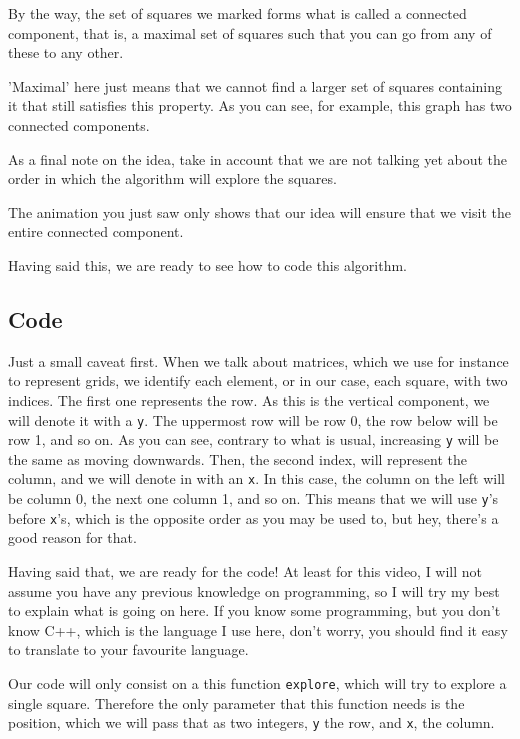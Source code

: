 \documentclass[12pt]{article}
\renewcommand{\v}[1]{\texttt{#1}}
\begin{document}
By the way, the set of squares we marked forms what is called
a connected component, that is, a maximal
set of squares such that you can go from any of these to any other.

'Maximal' here just means that we cannot find a larger set
of squares containing it that still satisfies this property.
As you can see, for example, this graph has two connected components.

As a final note on the idea, take in account that we
are not talking yet about the order in which the algorithm
will explore the squares.

The animation you just saw only shows
that our idea will ensure that we visit the entire
connected component.

Having said this, we are ready to see how
to code this algorithm.

\subsection{Code}

Just a small caveat first.
When we talk about matrices, which we use for instance to represent grids,
we identify each element, or in our case, each square,
with two indices. The first one represents the row.
As this is the vertical component, we will denote it
with a \v{y}. The uppermost row will be row 0, the row below
will be row 1, and so on. As you can see, contrary to what is
usual, increasing \v{y} will be the same as moving downwards.
Then, the second index, will represent the column, and we will
denote in with an \v{x}. In this case, the column on the left
will be column 0, the next one column 1, and so on.
This means that we will use \v{y}'s before \v{x}'s,
which is the opposite order as you may be used to, but hey,
there's a good reason for that.

Having said that, we are ready for the code!
At least for this video,
I will not assume you have any previous knowledge on programming,
so I will try my best to explain what is going on here.
If you know some programming, but you don't know C++,
which is the language I use here, don't worry,
you should find it easy to translate to your favourite
language.

Our code will only consist on a this function \verb|explore|,
which will try to explore a single square. Therefore
the only parameter that this function needs is the position,
which we will pass that as two integers, 
\verb|y| the row, and \verb|x|, the column.
\end{document}
